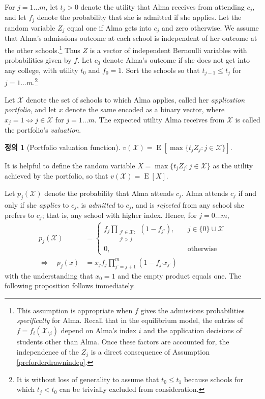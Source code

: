 \documentclass[12pt]{article} %
\theoremstyle{definition}
\newtheorem{definition}{Definition}
\theoremstyle{definition}
\newtheorem{definition}{정의}
\begin{document}
For $j=1\dots m$, let $t_j > 0$ denote the utility that Alma receives from attending $c_j$, and let $f_j$ denote the probability that she is admitted if she applies. Let the random variable $Z_j$ equal one if Alma gets into $c_j$ and zero otherwise.  We assume that Alma’s admissions outcome at each school is independent of her outcome at the other schools.\footnote{This assumption is appropriate when $f$ gives the admissions probabilities \emph{specifically} for Alma. Recall that in the equilibrium model, the entries of $f = f_{i}(\mathcal{X}_{\setminus i})$ depend on Alma’s index $i$ and the application decisions of students other than Alma. Once these factors are accounted for, the independence of the $Z_j$ is a direct consequence of Assumption \ref{preforderdrawnindep}. } Thus $Z$ is a vector of independent Bernoulli variables with probabilities given by $f$. Let $c_0$ denote Alma's outcome if she does not get into any college, with utility $t_0$ and $f_0 = 1$. Sort the schools so that $t_{j-1} \leq t_j$ for $j=1 \dots m$.\footnote{It is without loss of generality to assume that $t_0 \leq t_1$ because schools for which $t_j < t_0$ can be trivially excluded from consideration.}

Let $\mathcal{X}$ denote the set of schools to which Alma applies, called her \emph{application portfolio}, and let $x$ denote the same encoded as a binary vector, where $x_j=1 \iff j\in \mathcal{X}$ for $j=1\dots m$. The expected utility Alma receives from $\mathcal{X}$ is called the portfolio’s \emph{valuation}.
\begin{definition}[Portfolio valuation function]
$v(\mathcal{X}) = \operatorname{E}\left[ \max\{t_j Z_j : j \in \mathcal{X}\} \right]$.
\end{definition}
It is helpful to define the random variable $X  = \max\{ t_j Z_j : j \in \mathcal{X}\}$ as the utility achieved by the portfolio, so that $v(\mathcal{X}) = \operatorname{E}[X]$.

Let $p_j(\mathcal{X})$ denote the probability that Alma attends $c_j$. Alma attends $c_j$ if and only if she \emph{applies} to $c_j$, is \emph{admitted} to $c_j$, and is \emph{rejected} from any school she prefers to $c_j$; that is, any school with higher index. Hence, for $j= 0\dots m$,
\begin{align}
p_j(\mathcal{X}) &= 
\begin{cases}
\displaystyle f_j  \prod_{\substack{j’ \in \mathcal{X}: \\ j' > j}} (1 - f_{j’}), \quad & j \in \{0\}\cup\mathcal{X}\\
0, \quad & \text{otherwise}
\end{cases} \\
\iff\quad p_j(x) &= x_j  f_j \prod_{j’ = j+1}^m (1 - f_{j’} x_{j’})
\end{align}
with the understanding that $x_0 = 1$ and the empty product equals one. The following proposition follows immediately.
\end{document}
